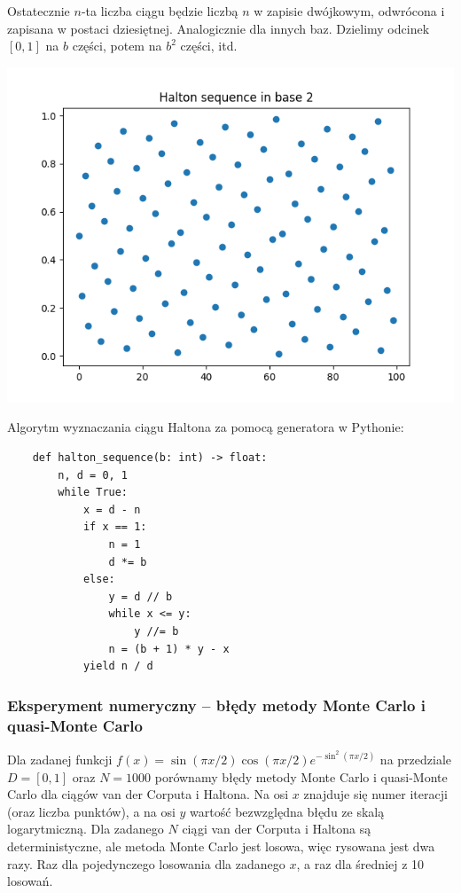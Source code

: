 \documentclass[a4paper,12pt]{article}
\begin{document}
Ostatecznie $n$-ta liczba ciągu będzie liczbą $n$ w zapisie dwójkowym,
odwrócona i zapisana w postaci dziesiętnej. Analogicznie dla innych baz. Dzielimy
odcinek $[0, 1]$ na $b$ części, potem na $b^2$ części, itd.

\begin{multicols}{2}
    \includegraphics[scale=0.5]{img/halton.png}

    \columnbreak

    Algorytm wyznaczania ciągu Haltona za pomocą
    generatora w Pythonie:
    \begin{lstlisting}
    def halton_sequence(b: int) -> float:
        n, d = 0, 1
        while True:
            x = d - n
            if x == 1:
                n = 1
                d *= b
            else:
                y = d // b
                while x <= y:
                    y //= b
                n = (b + 1) * y - x
            yield n / d
    \end{lstlisting}
\end{multicols}

\subsubsection*{Eksperyment numeryczny -- błędy metody Monte Carlo i quasi-Monte Carlo}

Dla zadanej funkcji $f(x) = \sin(\pi x / 2) \cos(\pi x / 2) e^{-\sin^2(\pi x / 2)}$
na przedziale $D = [0, 1]$
oraz $N = 1000$ porównamy błędy metody Monte Carlo i quasi-Monte Carlo dla
ciągów van der Corputa i Haltona.
Na osi $x$ znajduje się numer iteracji (oraz liczba punktów), a na osi $y$
wartość bezwzględna błędu ze skalą logarytmiczną.
Dla zadanego $N$ ciągi van der Corputa i Haltona są deterministyczne,
ale metoda Monte Carlo jest losowa, więc rysowana jest dwa razy.
Raz dla pojedynczego losowania dla zadanego $x$, a raz dla średniej z 10 losowań.
\end{document}
